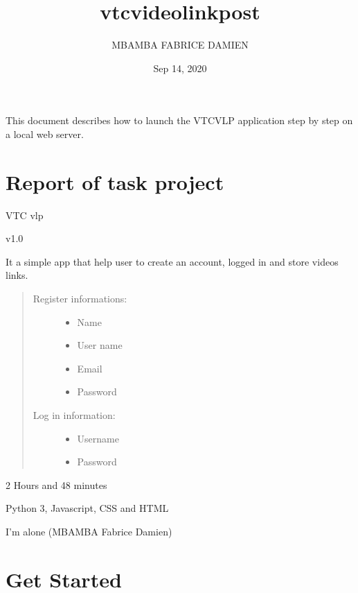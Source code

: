 \documentclass[letterpaper,10pt,english]{sphinxmanual}
\title{vtc\sphinxhyphen{}video\sphinxhyphen{}link\sphinxhyphen{}post}
\date{Sep 14, 2020}
\author{MBAMBA FABRICE DAMIEN}
\begin{document}
\pagestyle{empty}
\sphinxmaketitle
\pagestyle{plain}
\sphinxtableofcontents
\pagestyle{normal}
\label{\detokenize{index::doc}}


This document describes how to launch the VTC\sphinxhyphen{}VLP application step by step on a local web server.


\chapter{Report of task project}
\label{\detokenize{intro:report-of-task-project}}\label{\detokenize{intro::doc}}
 VTC \sphinxhyphen{} vlp

 v1.0

 It a simple app that help user to create an account, logged in and store videos links.
\begin{quote}
\begin{description}
\item[{Register informations:}] \leavevmode\begin{itemize}
\item {} 
Name

\item {} 
User name

\item {} 
Email

\item {} 
Password

\end{itemize}

\item[{Log in information:}] \leavevmode\begin{itemize}
\item {} 
Username

\item {} 
Password

\end{itemize}

\end{description}
\end{quote}

 2 Hours and 48 minutes

 Python 3, Javascript, CSS and HTML

 I’m alone (MBAMBA Fabrice Damien)


\chapter{Get Started}
\label{\detokenize{usage:get-started}}\label{\detokenize{usage::doc}}
\end{document}
